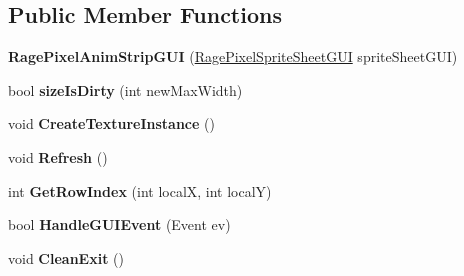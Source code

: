\subsection*{Public Member Functions}
\begin{DoxyCompactItemize}
\item 
\hypertarget{class_rage_pixel_anim_strip_g_u_i_a106c55c93cc4e2510406bb7663f86b7a}{{\bfseries Rage\-Pixel\-Anim\-Strip\-G\-U\-I} (\hyperlink{class_rage_pixel_sprite_sheet_g_u_i}{Rage\-Pixel\-Sprite\-Sheet\-G\-U\-I} sprite\-Sheet\-G\-U\-I)}\label{class_rage_pixel_anim_strip_g_u_i_a106c55c93cc4e2510406bb7663f86b7a}

\item 
\hypertarget{class_rage_pixel_anim_strip_g_u_i_aea61c5446d6b76f23435c0641e161dc4}{bool {\bfseries size\-Is\-Dirty} (int new\-Max\-Width)}\label{class_rage_pixel_anim_strip_g_u_i_aea61c5446d6b76f23435c0641e161dc4}

\item 
\hypertarget{class_rage_pixel_anim_strip_g_u_i_a3bf00838edd505b58ec33bd925e18456}{void {\bfseries Create\-Texture\-Instance} ()}\label{class_rage_pixel_anim_strip_g_u_i_a3bf00838edd505b58ec33bd925e18456}

\item 
\hypertarget{class_rage_pixel_anim_strip_g_u_i_a585fb26b714d0c21cdad454dda010613}{void {\bfseries Refresh} ()}\label{class_rage_pixel_anim_strip_g_u_i_a585fb26b714d0c21cdad454dda010613}

\item 
\hypertarget{class_rage_pixel_anim_strip_g_u_i_a70d70bb0fe4ca83c72df97b2d83aede1}{int {\bfseries Get\-Row\-Index} (int local\-X, int local\-Y)}\label{class_rage_pixel_anim_strip_g_u_i_a70d70bb0fe4ca83c72df97b2d83aede1}

\item 
\hypertarget{class_rage_pixel_anim_strip_g_u_i_a50b2400b3aaa01c2b5ee9cd3976d3645}{bool {\bfseries Handle\-G\-U\-I\-Event} (Event ev)}\label{class_rage_pixel_anim_strip_g_u_i_a50b2400b3aaa01c2b5ee9cd3976d3645}

\item 
\hypertarget{class_rage_pixel_anim_strip_g_u_i_ad52a0f900dc0344e4d5302b5b32cb429}{void {\bfseries Clean\-Exit} ()}\label{class_rage_pixel_anim_strip_g_u_i_ad52a0f900dc0344e4d5302b5b32cb429}

\end{DoxyCompactItemize}
